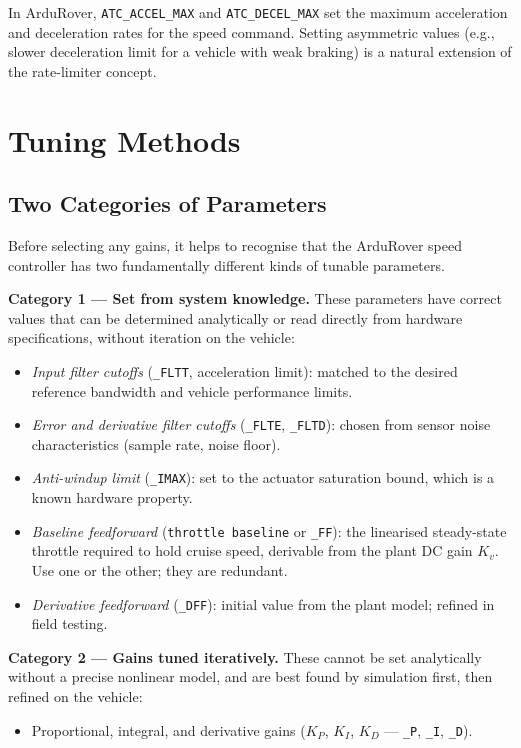 \documentclass[12pt]{article}
\begin{document}
In ArduRover, \texttt{ATC\_ACCEL\_MAX} and \texttt{ATC\_DECEL\_MAX} set the
maximum acceleration and deceleration rates for the speed command.  Setting
asymmetric values (e.g., slower deceleration limit for a vehicle with weak
braking) is a natural extension of the rate-limiter concept.


\section{Tuning Methods}
\label{sec:tuning}

\subsection{Two Categories of Parameters}
\label{sec:two_categories}

Before selecting any gains, it helps to recognise that the ArduRover speed
controller has two fundamentally different kinds of tunable parameters.

\textbf{Category 1 — Set from system knowledge.}  These parameters have
correct values that can be determined analytically or read directly from
hardware specifications, without iteration on the vehicle:
\begin{itemize}
  \item \emph{Input filter cutoffs} (\texttt{\_FLTT}, acceleration limit):
    matched to the desired reference bandwidth and vehicle performance limits.
  \item \emph{Error and derivative filter cutoffs} (\texttt{\_FLTE},
    \texttt{\_FLTD}): chosen from sensor noise characteristics (sample rate,
    noise floor).
  \item \emph{Anti-windup limit} (\texttt{\_IMAX}): set to the actuator
    saturation bound, which is a known hardware property.
  \item \emph{Baseline feedforward} (\texttt{throttle baseline} or
    \texttt{\_FF}): the linearised steady-state throttle required to hold
    cruise speed, derivable from the plant DC gain $K_v$.  Use one or the
    other; they are redundant.
  \item \emph{Derivative feedforward} (\texttt{\_DFF}): initial value
    from the plant model; refined in field testing.
\end{itemize}

\textbf{Category 2 — Gains tuned iteratively.}  These cannot be set
analytically without a precise nonlinear model, and are best found by
simulation first, then refined on the vehicle:
\begin{itemize}
  \item Proportional, integral, and derivative gains
    ($K_P$, $K_I$, $K_D$ — \texttt{\_P}, \texttt{\_I}, \texttt{\_D}).
\end{itemize}
\end{document}
